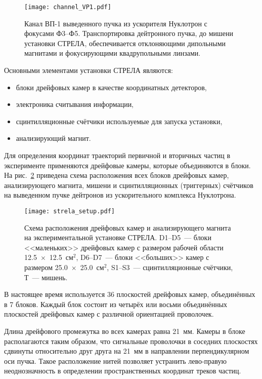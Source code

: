 \begin{figure}[h]
  \centering
  \texttt{[image: channel\_VP1.pdf]}
  \caption{Канал ВП-1 выведенного пучка из ускорителя Нуклотрон с фокусами
    Ф3--Ф5. Транспортировка дейтронного пучка, до мишени установки СТРЕЛА,
    обеспечивается отклоняющими дипольными магнитами и фокусирующими
    квадрупольными линзами.}
  \label{fig:channel_VP1}
\end{figure}

\noindent
Основными элементами установки СТРЕЛА являются:
\begin{itemize}
\item блоки дрейфовых камер в качестве координатных детекторов,
\item электроника считывания информации,
\item сцинтилляционные счётчики используемые для запуска установки,
\item анализирующий магнит.
\end{itemize}

Для определения координат траекторий первичной и вторичных частиц в эксперименте
применяются дрейфовые камеры, которые объединяются в блоки. На
рис.~\ref{fig:strela_setup} приведена схема расположения всех блоков дрейфовых
камер, анализирующего магнита, мишени и сцинтилляционных (триггерных) счётчиков
на выведенном пучке дейтронов из ускорительного комплекса Нуклотрона.

\begin{figure}[h]
  \centering
  \texttt{[image: strela\_setup.pdf]}
  \caption{Схема расположения дрейфовых камер и анализирующего магнита на
    экспериментальной установке СТРЕЛА. D1--D5~--- блоки <<маленьких>> дрейфовых
    камер с размером рабочей области 12.5~$\times$~12.5~см$^2$, D6--D7~---
    блоки <<больших>> камер с размером 25.0~$\times$~25.0~см$^2$, S1--S3~---
    сцинтилляционные счётчики,  Т~--- мишень.}
  \label{fig:strela_setup}
\end{figure}

В настоящее время используется 36 плоскостей дрейфовых камер, объединённых в 7
блоков. Каждый блок состоит из четырёх или восьми объединённых плоскостей
дрейфовых камер с различной ориентацией проволочек.

Длина дрейфового промежутка во всех камерах равна 21~мм.  Камеры в блоке
располагаются таким образом, что сигнальные проволочки в соседних плоскостях
сдвинуты относительно друг друга на 21~мм в направлении перпендикулярном оси
пучка. Такое расположение нитей позволяет устранить лево-правую неоднозначность
в определении пространственных координат треков частиц.

